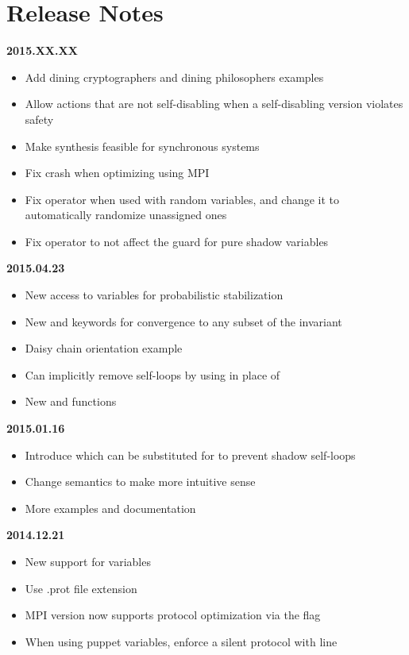 
\section{Release Notes}

\textbf{2015.XX.XX}
\begin{itemize}
\item Add dining cryptographers and dining philosophers examples
\item Allow actions that are not self-disabling when a self-disabling version violates safety
\item Make synthesis feasible for synchronous systems
\item Fix crash when optimizing using MPI
\item Fix \ilcode{-=>} operator when used with random variables, and change it to automatically randomize unassigned ones
\item Fix \ilcode{-=>} operator to not affect the guard for pure shadow variables
\end{itemize}
\textbf{2015.04.23}
\begin{itemize}
\item New  access to variables for probabilistic stabilization
\item New  and  keywords for convergence to any subset of the invariant
\item Daisy chain orientation example
\item Can implicitly remove self-loops by using \ilcode{-=>} in place of \ilcode{-->}
\item New  and  functions
\end{itemize}
\textbf{2015.01.16}
\begin{itemize}
\item Introduce  which can be substituted for  to prevent shadow self-loops
\item Change  semantics to make more intuitive sense
\item More examples and documentation
\end{itemize}
\textbf{2014.12.21}
\begin{itemize}
\item New support for  variables
\item Use .prot file extension
\item MPI version now supports protocol optimization via the  flag
\item When using puppet variables, enforce a silent protocol with  line
\end{itemize}
